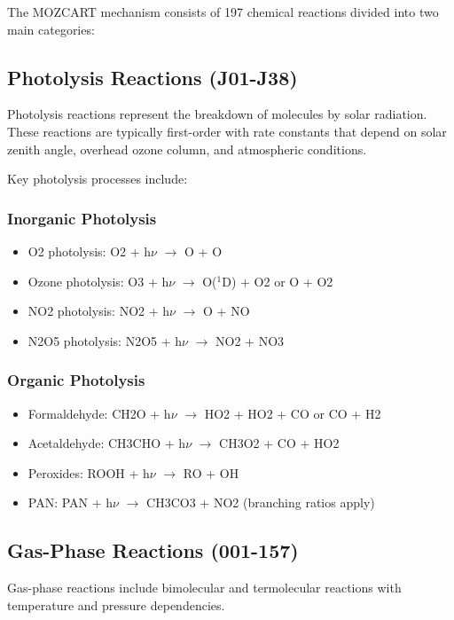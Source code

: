\documentclass[12pt,a4paper]{article}
\begin{document}
The MOZCART mechanism consists of 197 chemical reactions divided into two main categories:

\subsection{Photolysis Reactions (J01-J38)}

Photolysis reactions represent the breakdown of molecules by solar radiation. These reactions are typically first-order with rate constants that depend on solar zenith angle, overhead ozone column, and atmospheric conditions.

Key photolysis processes include:

\subsubsection{Inorganic Photolysis}
\begin{itemize}
    \item O2 photolysis: O2 + h$\nu$ $\rightarrow$ O + O
    \item Ozone photolysis: O3 + h$\nu$ $\rightarrow$ O($^1$D) + O2 or O + O2
    \item NO2 photolysis: NO2 + h$\nu$ $\rightarrow$ O + NO
    \item N2O5 photolysis: N2O5 + h$\nu$ $\rightarrow$ NO2 + NO3
\end{itemize}

\subsubsection{Organic Photolysis}
\begin{itemize}
    \item Formaldehyde: CH2O + h$\nu$ $\rightarrow$ HO2 + HO2 + CO or CO + H2
    \item Acetaldehyde: CH3CHO + h$\nu$ $\rightarrow$ CH3O2 + CO + HO2
    \item Peroxides: ROOH + h$\nu$ $\rightarrow$ RO + OH
    \item PAN: PAN + h$\nu$ $\rightarrow$ CH3CO3 + NO2 (branching ratios apply)
\end{itemize}

\subsection{Gas-Phase Reactions (001-157)}

Gas-phase reactions include bimolecular and termolecular reactions with temperature and pressure dependencies.
\end{document}
